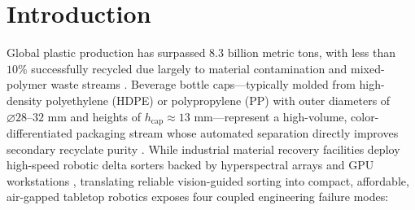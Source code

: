 \documentclass[10pt,twocolumn,letterpaper]{article}
\begin{document}
\begin{abstract}
\end{abstract}

\section{Introduction}
\label{sec:intro}

Global plastic production has surpassed $8.3\text{ billion}$ metric tons, with less than $10\%$ successfully recycled due largely to material contamination and mixed-polymer waste streams \cite{geyer2017production}. Beverage bottle caps—typically molded from high-density polyethylene (HDPE) or polypropylene (PP) with outer diameters of $\varnothing 28\text{--}32\text{ mm}$ and heights of $h_{\mathrm{cap}}\approx 13\text{ mm}$—represent a high-volume, color-differentiated packaging stream whose automated separation directly improves secondary recyclate purity \cite{gundupalli2017review,wilts2021artificial}. While industrial material recovery facilities deploy high-speed robotic delta sorters backed by hyperspectral arrays and GPU workstations \cite{lukka2014zenrobotics,koskinopoulou2021robotic,kiyokawa2023challenges}, translating reliable vision-guided sorting into compact, affordable, air-gapped tabletop robotics exposes four coupled engineering failure modes:
\end{document}
